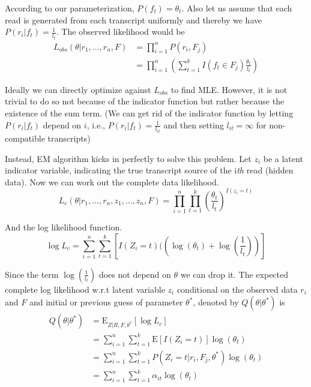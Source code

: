 \documentclass[12pt]{article}
\newcommand{\E}{\mathrm{E}}
\begin{document}
According to our parameterization, $P(f_t) = \theta_t$. Also let us assume that each read is generated from each transcript uniformly and thereby we have $P(r_i|f_t) = \frac{1}{l_t}$. The observed likelihood would be 
\begin{align}
L_{obs}(\theta|r_1,...,r_n, F) &= \prod_{i=1}^{n}P(r_i,F_j) \\
						  &= \prod_{i=1}^{n} (\sum_{t=1}^{k}I(f_t \in F_j)\frac{\theta_t}{l_t})
\end{align}

 Ideally we can directly optimize against $L_{obs}$ to find MLE. However, it is not trivial to do so not because of the indicator function but rather because the existence of the sum term. (We can get rid of the indicator function by letting $P(r_i|f_t)$ depend on $i$, i.e., $P(r_i|f_t) = \frac{1}{l_{it}}$ and then setting $l_{it} = \infty$ for non-compatible transcripts)


Instead, EM algorithm kicks in perfectly to solve this problem. Let $z_i$ be a latent indicator variable, indicating the true transcript source of the i\textit{th} read (hidden data). Now we can work out the complete data likelihood.
\begin{equation}
L_c(\theta|r_1,...,r_n, z_1,...,z_n, F) = \prod_{i=1}^{n}\prod_{t=1}^{k} (\frac{\theta_t}{l_t})^{I(z_i=t)}
\end{equation}

And the log likelihood function.
\begin{equation}
\log L_c = \sum_{i=1}^{n}\sum_{t=1}^{k} \left[I(Z_i = t)((\log(\theta_t) + \log(\frac{1}{l_t}))\right] 
\end{equation}

Since the term $\log(\frac{1}{l_t})$ does not depend on $\theta$ we can drop it. The expected complete log likelihood w.r.t latent variable $z_i$ conditional on the observed data $r_i$ and $F$ and initial or previous guess of parameter $\theta^*$, denoted by $Q(\theta | \theta^*)$ is
\begin{align}
Q(\theta | \theta^*) &= \E_{Z|R,F,\theta^*}\left[\log L_c\right] \\
                     &= \sum_{i=1}^{n}\sum_{t=1}^{k} \E\left[I(Z_i = t)\right]\log(\theta_t) \\
                     &= \sum_{i=1}^{n}\sum_{t=1}^{k} P(Z_i=t|r_i,F_j,\theta^*)\log(\theta_t) \\
                     &= \sum_{i=1}^{n}\sum_{t=1}^{k} \alpha_{it}\log(\theta_t)
\end{align}
\end{document}
